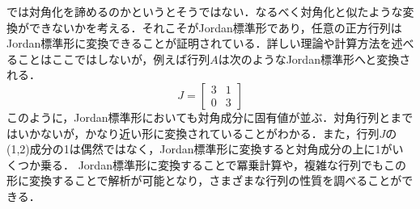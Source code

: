 \documentclass[a4paper,12pt,autodetect-engine,dvipdfmx]{jsarticle}
\theoremstyle{definition}
\begin{document}
では対角化を諦めるのかというとそうではない．なるべく対角化と似たような変換ができないかを考える．それこそがJordan標準形であり，任意の正方行列は
Jordan標準形に変換できることが証明されている．詳しい理論や計算方法を述べることはここではしないが，例えば行列$A$は次のようなJordan標準形へと変換される．
\begin{equation*}
    J=
    \begin{bmatrix}
        3 & 1\\
        0 & 3
    \end{bmatrix}
\end{equation*}
このように，Jordan標準形においても対角成分に固有値が並ぶ．対角行列とまではいかないが，かなり近い形に変換されていることがわかる．また，行列$J$の(1,2)成分の1は偶然ではなく，Jordan標準形に変換すると対角成分の上に1がいくつか乗る．
Jordan標準形に変換することで冪乗計算や，複雑な行列でもこの形に変換することで解析が可能となり，さまざまな行列の性質を調べることができる．
\end{document}
